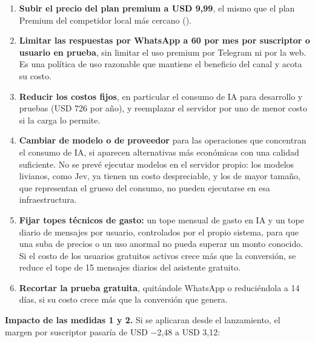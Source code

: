 \begin{enumerate}
\def\labelenumi{\arabic{enumi}.}
\tightlist
\item
  \textbf{Subir el precio del plan premium a USD 9,99}, el mismo que el
  plan Premium del competidor local más cercano
  ().
\item
  \textbf{Limitar las respuestas por WhatsApp a 60 por mes por
  suscriptor o usuario en prueba}, sin limitar el uso premium por
  Telegram ni por la web. Es una política de uso razonable que mantiene
  el beneficio del canal y acota su costo.
\item
  \textbf{Reducir los costos fijos}, en particular el consumo de IA para
  desarrollo y pruebas (USD 726 por año), y reemplazar el servidor por
  uno de menor costo si la carga lo permite.
\item
  \textbf{Cambiar de modelo o de proveedor} para las operaciones que
  concentran el consumo de IA, si aparecen alternativas más económicas
  con una calidad suficiente. No se prevé ejecutar modelos en el
  servidor propio: los modelos livianos, como Jev, ya tienen un costo
  despreciable, y los de mayor tamaño, que representan el grueso del
  consumo, no pueden ejecutarse en esa infraestructura.
\item
  \textbf{Fijar topes técnicos de gasto:} un tope mensual de gasto en IA
  y un tope diario de mensajes por usuario, controlados por el propio
  sistema, para que una suba de precios o un uso anormal no pueda
  superar un monto conocido. Si el costo de los usuarios gratuitos
  activos crece más que la conversión, se reduce el tope de 15 mensajes
  diarios del asistente gratuito.
\item
  \textbf{Recortar la prueba gratuita}, quitándole WhatsApp o
  reduciéndola a 14 días, si su costo crece más que la conversión que
  genera.
\end{enumerate}

\textbf{Impacto de las medidas 1 y 2.} Si se aplicaran desde el
lanzamiento, el margen por suscriptor pasaría de USD −2,48 a USD 3,12:

